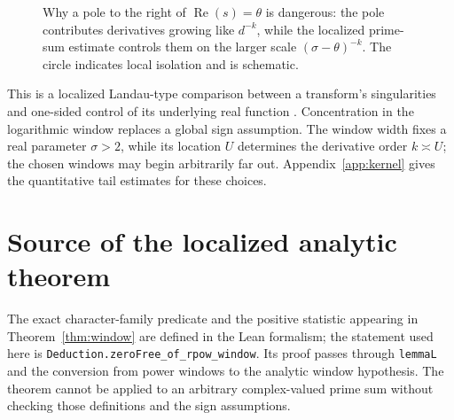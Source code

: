 \documentclass[11pt,openany,oneside]{scrbook}
\theoremstyle{definition}
\theoremstyle{remark}
\newcommand{\Rea}{\operatorname{Re}}
\begin{document}
\begin{figure}[ht]
\centering
{}
\caption{Why a pole to the right of $\Rea(s)=\theta$ is dangerous: the pole contributes derivatives growing like $d^{-k}$, while the localized prime-sum estimate controls them on the larger scale $(\sigma-\theta)^{-k}$. The circle indicates local isolation and is schematic.}
\label{fig:pole-distance}
\end{figure}

This is a localized Landau-type comparison between a transform's singularities and one-sided control of its underlying real function \parencite{Landau1905}. Concentration in the logarithmic window replaces a global sign assumption. The window width fixes a real parameter $\sigma>2$, while its location $U$ determines the derivative order $k\asymp U$; the chosen windows may begin arbitrarily far out. Appendix~\ref{app:kernel} gives the quantitative tail estimates for these choices.

\section*{Source of the localized analytic theorem}
The exact character-family predicate and the positive statistic appearing in Theorem~\ref{thm:window} are defined in the Lean formalism; the statement used here is \texttt{Deduction.zeroFree\_of\_rpow\_window}. Its proof passes through \texttt{lemmaL} and the conversion from power windows to the analytic window hypothesis. The theorem cannot be applied to an arbitrary complex-valued prime sum without checking those definitions and the sign assumptions.
\end{document}
